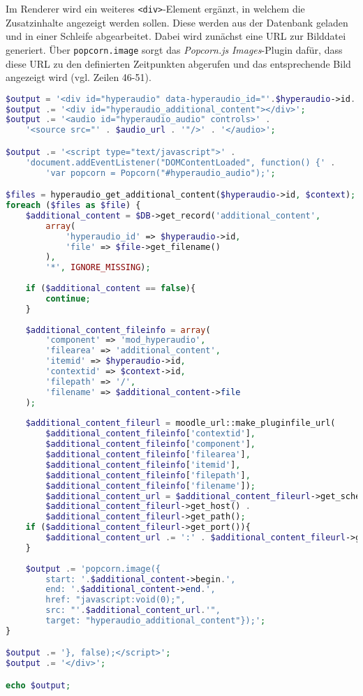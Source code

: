 Im Renderer wird ein weiteres \texttt{<div>}-Element ergänzt, in welchem die Zusatzinhalte angezeigt werden sollen. Diese werden aus der Datenbank geladen und in einer Schleife abgearbeitet. Dabei wird zunächst eine URL zur Bilddatei generiert. Über \texttt{popcorn.image} sorgt das \textit{Popcorn.js} \textit{Images}-Plugin dafür, dass diese URL zu den definierten Zeitpunkten abgerufen und das entsprechende Bild angezeigt wird (vgl. Zeilen 46-51).

\begin{lstlisting}[language=php,
             linewidth=\textwidth,
             caption={Ausschnitt der \textbf{renderer.php} in der 2. Iteration},
             label={lst:it2:renderer}]
$output = '<div id="hyperaudio" data-hyperaudio_id="'.$hyperaudio->id.'">';
$output .= '<div id="hyperaudio_additional_content"></div>';
$output .= '<audio id="hyperaudio_audio" controls>' .
    '<source src="' . $audio_url . '"/>' . '</audio>';

$output .= '<script type="text/javascript">' .
    'document.addEventListener("DOMContentLoaded", function() {' .
        'var popcorn = Popcorn("#hyperaudio_audio");';

$files = hyperaudio_get_additional_content($hyperaudio->id, $context);
foreach ($files as $file) {
    $additional_content = $DB->get_record('additional_content',
        array(
            'hyperaudio_id' => $hyperaudio->id,
            'file' => $file->get_filename()
	    ),
        '*', IGNORE_MISSING);
	
    if ($additional_content == false){
        continue;
	}
	
    $additional_content_fileinfo = array(
        'component' => 'mod_hyperaudio',
        'filearea' => 'additional_content',
        'itemid' => $hyperaudio->id,
        'contextid' => $context->id,
        'filepath' => '/',
        'filename' => $additional_content->file
    );
	
    $additional_content_fileurl = moodle_url::make_pluginfile_url(
        $additional_content_fileinfo['contextid'],
        $additional_content_fileinfo['component'],
        $additional_content_fileinfo['filearea'],
        $additional_content_fileinfo['itemid'],
        $additional_content_fileinfo['filepath'],
        $additional_content_fileinfo['filename']);
        $additional_content_url = $additional_content_fileurl->get_scheme() . '://' .
        $additional_content_fileurl->get_host() . 
        $additional_content_fileurl->get_path();
    if ($additional_content_fileurl->get_port()){
        $additional_content_url .= ':' . $additional_content_fileurl->get_port();
    }
	
    $output .= 'popcorn.image({
        start: '.$additional_content->begin.',
        end: '.$additional_content->end.',
        href: "javascript:void(0);",
        src: "'.$additional_content_url.'",
        target: "hyperaudio_additional_content"});';
}

$output .= '}, false);</script>';
$output .= '</div>';

echo $output;
\end{lstlisting}

